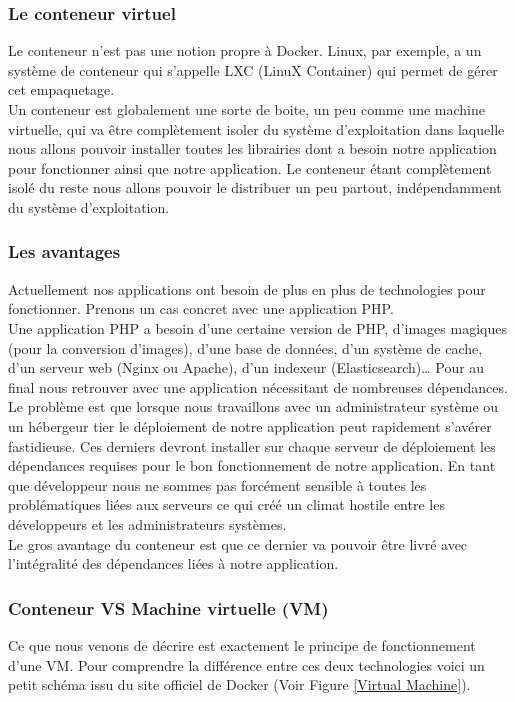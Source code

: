       \subsubsection{Le conteneur virtuel}
      Le conteneur n’est pas une notion propre à Docker. Linux, par exemple, a un système de conteneur qui s’appelle LXC (LinuX Container) qui permet de gérer cet empaquetage.\\

      Un conteneur est globalement une sorte de boite, un peu comme une machine virtuelle, qui va être complètement isoler du système d’exploitation dans laquelle nous allons pouvoir installer toutes les librairies dont a besoin notre application pour fonctionner ainsi que notre application. Le conteneur étant complètement isolé du reste nous allons pouvoir le distribuer un peu partout, indépendamment du système d’exploitation.

      \subsubsection{Les avantages}
      Actuellement nos applications ont besoin de plus en plus de technologies pour fonctionner. Prenons un cas concret avec une application PHP.\\

      Une application PHP a besoin d’une certaine version de PHP, d’images magiques (pour la conversion d’images), d’une base de données, d’un système de cache, d’un serveur web (Nginx ou Apache), d’un indexeur (Elasticsearch)… Pour au final nous retrouver avec une application nécessitant de nombreuses dépendances.\\

      Le problème est que lorsque nous travaillons avec un administrateur système ou un hébergeur tier le déploiement de notre application peut rapidement s’avérer fastidieuse. Ces derniers devront installer sur chaque serveur de déploiement les dépendances requises pour le bon fonctionnement de notre application. En tant que développeur nous ne sommes pas forcément sensible à toutes les problématiques liées aux serveurs ce qui créé un climat hostile entre les développeurs et les administrateurs systèmes.\\

      Le gros avantage du conteneur est que ce dernier va pouvoir être livré avec l’intégralité des dépendances liées à notre application.

      \subsubsection{Conteneur VS Machine virtuelle (VM)}
      Ce que nous venons de décrire est exactement le principe de fonctionnement d’une VM. Pour comprendre la différence entre ces deux technologies voici un petit schéma issu du site officiel de Docker (Voir Figure \ref{Virtual Machine}).\\

